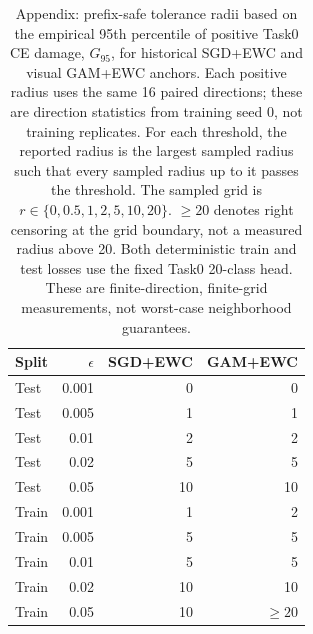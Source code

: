 \begin{table}[t]
\centering
\small
\caption{Appendix: prefix-safe tolerance radii based on the empirical 95th percentile of positive Task0 CE damage, $G_{95}$, for historical SGD+EWC and visual GAM+EWC anchors. Each positive radius uses the same 16 paired directions; these are direction statistics from training seed 0, not training replicates. For each threshold, the reported radius is the largest sampled radius such that every sampled radius up to it passes the threshold. The sampled grid is $r\in\{0,0.5,1,2,5,10,20\}$. $\geq 20$ denotes right censoring at the grid boundary, not a measured radius above 20. Both deterministic train and test losses use the fixed Task0 20-class head. These are finite-direction, finite-grid measurements, not worst-case neighborhood guarantees.}
\label{tab:rq2_q95_tolerance}
\begin{tabular}{lrrr}
\toprule
Split & $\epsilon$ & SGD+EWC & GAM+EWC \\
\midrule
Test & 0.001 & 0 & 0 \\
Test & 0.005 & 1 & 1 \\
Test & 0.01 & 2 & 2 \\
Test & 0.02 & 5 & 5 \\
Test & 0.05 & 10 & 10 \\
Train & 0.001 & 1 & 2 \\
Train & 0.005 & 5 & 5 \\
Train & 0.01 & 5 & 5 \\
Train & 0.02 & 10 & 10 \\
Train & 0.05 & 10 & $\geq 20$ \\
\bottomrule
\end{tabular}
\end{table}

